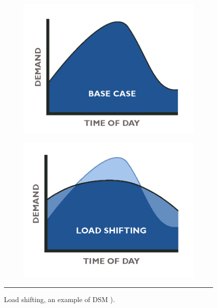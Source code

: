 \begin{figure}
	\centering
	\begin{subfigure}{.2\textwidth}
		\centering
		\includegraphics[width=\textwidth]{figures/DSM-base.png}
	\end{subfigure}
	\begin{subfigure}{.2\textwidth}
		\centering
		\includegraphics[width=\textwidth]{figures/DSM-load-shift.png}
	\end{subfigure}
	\rule{0.2\textwidth}{0.5pt} %
	\caption[Load shifting, an example of DSM.]{Load shifting, an example of DSM \citep{USAID}).}
	\label{fig:DSM}
\end{figure}

